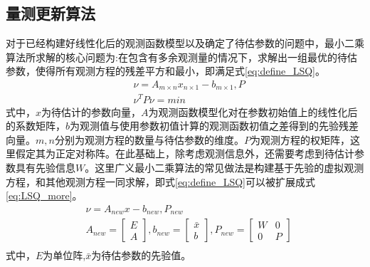\subsection{量测更新算法}

对于已经构建好线性化后的观测函数模型以及确定了待估参数的问题中，最小二乘算法所求解的核心问题为:在包含有多余观测量的情况下，求解出一组最优的待估参数，使得所有观测方程的残差平方和最小，即满足式\eqref{eq:define_LSQ}。
    \begin{equation}
        \begin{aligned}
		& \nu = A_{m\times{n}}x_{n\times{1}}-b_{m\times{1}},P \\
		& \nu^{T}P\nu=min
        \end{aligned}
        \label{eq:define_LSQ}
    \end{equation}
式中，\(x\)为待估计的参数向量，\(A\)为观测函数模型化对在参数初始值上的线性化后的系数矩阵，\(b\)为观测值与使用参数初值计算的观测函数初值之差得到的先验残差向量。\(m,n\)分别为观测方程的数量与待估参数的维度。\(P\)为观测方程的权矩阵，这里假定其为正定对称阵。在此基础上，除考虑观测信息外，还需要考虑到待估计参数具有先验信息\(W\)。这里广义最小二乘算法的常见做法是构建基于先验的虚拟观测方程，和其他观测方程一同求解，即式\eqref{eq:define_LSQ}可以被扩展成式\eqref{eq:LSQ_more}。
    \begin{equation}
        \begin{aligned}
		& \nu =A_{new}x-b_{new},P_{new} \\ 
		& A_{new} = 
		\begin{bmatrix}
			E \\
			A 
		\end{bmatrix},
		b_{new} = 
		\begin{bmatrix}
			\bar{x}\\
			b
		\end{bmatrix},
		P_{new}=
		\begin{bmatrix}
			W & 0 \\
			0 & P
		\end{bmatrix}\\
        \end{aligned}
        \label{eq:LSQ_more}
    \end{equation}
式中，\(E\)为单位阵,\(\bar{x}\)为待估参数的先验值。

